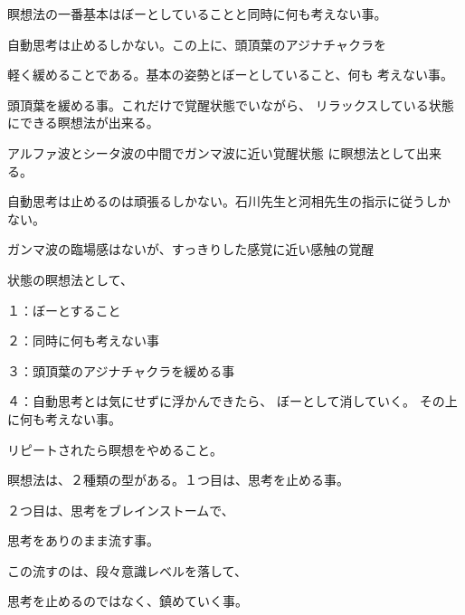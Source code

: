 \documentclass{jsarticle}
\begin{document}
  瞑想法の一番基本はぼーとしていることと同時に何も考えない事。

  自動思考は止めるしかない。この上に、頭頂葉のアジナチャクラを

  軽く緩めることである。基本の姿勢とぼーとしていること、何も
  考えない事。

  頭頂葉を緩める事。これだけで覚醒状態でいながら、
  リラックスしている状態にできる瞑想法が出来る。
 
  アルファ波とシータ波の中間でガンマ波に近い覚醒状態
  に瞑想法として出来る。
  
  自動思考は止めるのは頑張るしかない。石川先生と河相先生の指示に従うしか
  ない。

  ガンマ波の臨場感はないが、すっきりした感覚に近い感触の覚醒

  状態の瞑想法として、

  １：ぼーとすること

  ２：同時に何も考えない事

  ３：頭頂葉のアジナチャクラを緩める事

   ４：自動思考とは気にせずに浮かんできたら、
    ぼーとして消していく。
    その上に何も考えない事。

    リピートされたら瞑想をやめること。

    瞑想法は、２種類の型がある。１つ目は、思考を止める事。
     
                                ２つ目は、思考をブレインストームで、
				 
				思考をありのまま流す事。
				 
				この流すのは、段々意識レベルを落して、
				 
				思考を止めるのではなく、鎮めていく事。
\end{document}
